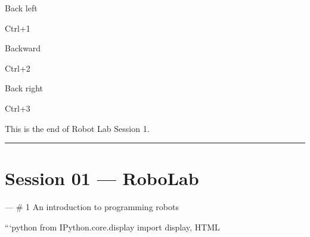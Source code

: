 \documentclass[letterpaper,10pt,english]{sphinxmanual}
\begin{document}
\noindent{}

Back left

Ctrl+1





\noindent{}

Backward

Ctrl+2





\noindent{}

Back right

Ctrl+3









This is the end of Robot Lab Session 1.


\bigskip\hrule\bigskip



\section{Session 01 — RoboLab}
\label{\detokenize{index:session-01-robolab}}


---
# 1 An introduction to programming robots

```python
from IPython.core.display import display, HTML
\end{document}
